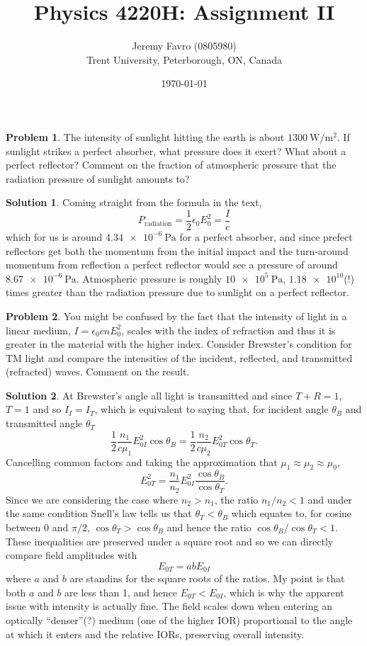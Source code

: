 \documentclass[10pt]{article}
\title{Physics 4220H: Assignment II}
\author{Jeremy Favro (0805980) \\ Trent University, Peterborough, ON, Canada}
\date{\today}
\theoremstyle{definition}
\newtheorem{problem}{Problem}
\newtheorem{soln}{Solution}
\begin{document}
\maketitle

\begin{problem}
The intensity of sunlight hitting the earth is about $\qty{1300}{\watt\per\meter\squared}$. If sunlight strikes a
perfect absorber, what pressure does it exert? What about a perfect reflector?
Comment on the fraction of atmospheric pressure that the radiation pressure of
sunlight amounts to?
\end{problem}
\begin{soln}
  Coming straight from the formula in the text,
  $$P_{\text{radiation}}=\frac{1}{2}\epsilon_0E_0^2=\frac{I}{c}$$
  which for us is around $\qty{4.34e-6}{\pascal}$ for a perfect absorber, and since prefect reflectors
  get both the momentum from the initial impact and the turn-around momentum from reflection a perfect reflector would see a pressure of around
  $\qty{8.67e-6}{\pascal}$. Atmospheric pressure is roughly $\qty{10e5}{\pascal}$, $\num{1.18e10}$(!) times greater than the radiation pressure due to
  sunlight on a perfect reflector.
\end{soln}

\begin{problem}
You might be confused by the fact that the intensity of light in a linear medium,
$I=\epsilon_0cnE_0^2$, scales with the index of refraction and thus it is greater in the material
with the higher index. Consider Brewster's condition for TM light and compare the
intensities of the incident, reflected, and transmitted (refracted) waves. Comment
on the result.
\end{problem}
\begin{soln}
  At Brewster's angle all light is transmitted and since $T+R=1$, $T=1$ and so $I_I=I_T$, which is equivalent to saying that,
  for incident angle $\theta_B$ and transmitted angle $\theta_T$
  $$\frac{1}{2}\frac{n_1}{c\mu_1}E_{0I}^2\cos\theta_B=\frac{1}{2}\frac{n_2}{c\mu_2}E_{0T}^2\cos\theta_T.$$
  Cancelling common factors and taking the approximation that $\mu_1\approx\mu_2\approx \mu_0$,
  $$E_{0T}^2=\frac{n_1}{n_2}E_{0I}^2\frac{\cos\theta_B}{\cos\theta_T}.$$
  Since we are considering the case where $n_2>n_1$, the ratio $n_1/n_2<1$ and
  under the same condition Snell's law tells us that $\theta_T<\theta_B$ which equates to,
  for cosine between $0$ and $\pi/2$, $\cos\theta_T>\cos\theta_B$
  and hence the ratio $\cos\theta_B/\cos\theta_T<1$. These inequalities are preserved under a
  square root and so we can directly compare field amplitudes with
  $$E_{0T}=abE_{0I}$$
  where $a$ and $b$ are standins for the square roots of the ratios. My point is that both $a$ and $b$ are
  less than 1, and hence $E_{0T}<E_{0I}$, which is why the apparent issue with intensity is actually fine.
  The field scales down when entering an optically ``denser''(?) medium (one of the higher IOR)
  proportional to the angle at which it enters and the relative IORs, preserving overall intensity.
\end{soln}
\newpage
\end{document}
